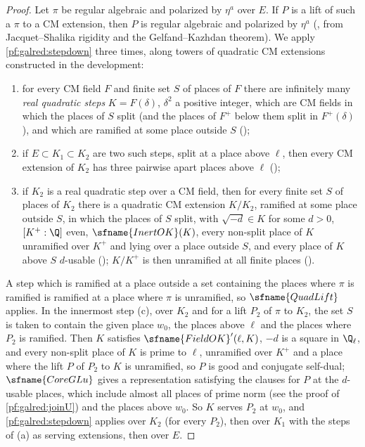 \begin{proof}
Let $\pi$ be regular algebraic and polarized by $\eta^a$ over $E$. If $P$ is a lift of such a $\pi$ to a CM extension, then $P$
is regular algebraic and polarized by $\eta^a$ (, from Jacquet--Shalika
rigidity and the Gelfand--Kazhdan theorem). We apply \cref{pf:galred:stepdown} three times, along towers of quadratic CM
extensions constructed in the development:
\begin{enumerate}[label=(\alph*),nosep]
\item for every CM field $F$ and finite set $S$ of places of $F$ there are infinitely many \emph{real quadratic steps}
  $K=F(\delta)$, $\delta^2$ a positive integer, which are CM fields in which the places of $S$ split (and the places of $F^+$ below
  them split in $F^+(\delta)$), and which are ramified at some place outside $S$
  ();
\item if $E\subset K_1\subset K_2$ are two such steps, split at a place above $\ell$, then every CM extension of $K_2$ has three
  pairwise apart places above $\ell$ ();
\item if $K_2$ is a real quadratic step over a CM field, then for every finite set $S$ of places of $K_2$ there is a quadratic CM
  extension $K/K_2$, ramified at some place outside $S$, in which the places of $S$ split, with $\sqrt{-d}\in K$ for some $d>0$,
  $[K^+:\Q]$ even, $\sfname{InertOK}(K)$, every non-split place of $K$ unramified over $K^+$ and lying over a place outside
  $S$, and every place of $K$ above $S$ $d$-usable (); $K/K^+$
  is then unramified at all finite places ().
\end{enumerate}
A step which is ramified at a place outside a set containing the places where $\pi$ is ramified is ramified at a place where
$\pi$ is unramified, so $\sfname{QuadLift}$ applies. In the innermost step
(c), over $K_2$ and for a lift $P_2$ of $\pi$ to $K_2$, the set $S$ is taken to contain the given place $w_0$, the places above
$\ell$ and the places where $P_2$ is ramified. Then $K$ satisfies $\sfname{FieldOK}'(\ell,K)$, $-d$ is a square in $\Q_\ell$,
and every non-split place of $K$ is prime to $\ell$, unramified over $K^+$ and a place where the lift $P$ of $P_2$ to $K$ is
unramified, so $P$ is good and conjugate self-dual; $\sfname{CoreGLu}$ gives a representation satisfying the clauses for $P$ at
the $d$-usable places, which include almost all places of prime norm (see the proof of \cref{pf:galred:joinU}) and the
places above $w_0$. So $K$ serves $P_2$ at $w_0$, and \cref{pf:galred:stepdown} applies over $K_2$ (for every $P_2$), then over
$K_1$ with the steps of (a) as serving extensions, then over $E$.
\end{proof}

